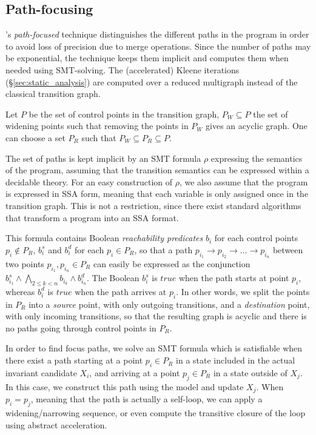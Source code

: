 \documentclass[preprint]{sigplanconf}
\begin{document}
\subsection{Path-focusing}
\label{sec:path_focusing}

\citet{Monniaux_Gonnord_SAS11}'s \emph{path-focused} technique
distinguishes the different paths in the program in order to avoid loss of
precision due to merge operations. Since the number of paths may be exponential,
the technique keeps them implicit and computes them when needed using
SMT-solving.
The (accelerated) Kleene iterations (\S\ref{sec:static_analysis}) are computed over a reduced multigraph instead of the classical transition graph.

Let $P$ be the set of control points in the transition graph, 
$P_W \subseteq P$ the set of widening points
such that removing the points in $P_W$ gives an acyclic graph.
One can choose a set $P_R$ such that $P_W \subseteq P_R \subseteq P$.

The set of paths is kept implicit by an SMT formula $\rho$ expressing
the semantics of the program, assuming that the transition semantics can be
expressed within a decidable theory. For an easy construction of $\rho$, 
we also assume that the program is expressed in SSA form, meaning that each
variable is only assigned once in the transition graph. This is not a
restriction, since there exist standard algorithms that transform a program into
an SSA format.

This formula contains Boolean \emph{reachability predicates} $b_i$ for each
control points $p_i \notin P_R$, $b_i^s$ and $b_i^d$ for each $p_i \in P_R$, so
that a path 
$p_{i_1} \rightarrow p_{i_2} \rightarrow \dots \rightarrow p_{i_n}$ 
between two points $p_{i_1}, p_{i_n} \in P_R$ 
can easily be expressed as the
conjunction $b_{i_1}^s \wedge \bigwedge_{2 \leq k < n} b_{i_k} \wedge b_{i_n}^d$.
The Boolean $b_{i}^s$ is $true$ when the path starts at point $p_i$, whereas
$b_i^d$ is $true$ when the path arrives at $p_i$. In other words, we split the
points in $P_R$ into a \emph{source} point, with only outgoing transitions, and
a \emph{destination} point, with only incoming transitions, so that the
resulting graph is acyclic and there is no paths going through control
points in $P_R$.

In order to find focus paths, we solve an SMT formula which is satisfiable when
there exist a path starting at a point $p_i \in P_R$ in a state included in the
actual invariant candidate $X_i$, and arriving at a point $p_j \in P_R$ in a
state outside of $X_j$. In this case, we construct this path using the model and
update $X_j$. When $p_i = p_j$, meaning that the path is actually a self-loop,
we can apply a widening/narrowing sequence, or even compute the transitive
closure of the loop using abstract acceleration. %
\end{document}
